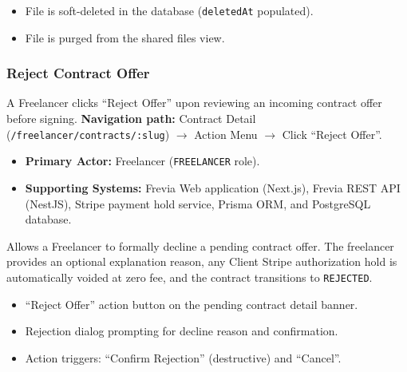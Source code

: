 \begin{itemize}[leftmargin=1.6em,topsep=3pt,itemsep=2pt,parsep=0pt,label=$\bullet$]
      \item File is soft-deleted in the database (\texttt{deletedAt} populated).
      \item File is purged from the shared files view.
\end{itemize}

\subsubsection{ Reject Contract Offer}

A Freelancer clicks ``Reject Offer'' upon reviewing an incoming contract offer before signing.\newline
\textbf{Navigation path:} Contract Detail (\texttt{/freelancer/contracts/:slug}) $\rightarrow$ Action Menu $\rightarrow$ Click ``Reject Offer''.


\begin{itemize}[leftmargin=1.6em,topsep=3pt,itemsep=2pt,parsep=0pt,label=$\bullet$]
      \item \textbf{Primary Actor:} Freelancer (\texttt{FREELANCER} role).
      \item \textbf{Supporting Systems:} Frevia Web application (Next.js), Frevia REST API (NestJS), Stripe payment hold service, Prisma ORM, and PostgreSQL database.
\end{itemize}

\noindent Allows a Freelancer to formally decline a pending contract offer. The freelancer provides an optional explanation reason, any Client Stripe authorization hold is automatically voided at zero fee, and the contract transitions to \texttt{REJECTED}.

\begin{itemize}[leftmargin=1.6em,topsep=3pt,itemsep=2pt,parsep=0pt,label=$\bullet$]
      \item ``Reject Offer'' action button on the pending contract detail banner.
      \item Rejection dialog prompting for decline reason and confirmation.
      \item Action triggers: ``Confirm Rejection'' (destructive) and ``Cancel''.
\end{itemize}

